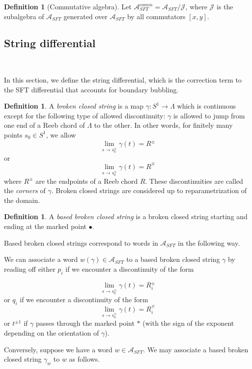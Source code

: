 \documentclass[a4paper,final, reqno]{amsart}
\theoremstyle{plain}
\theoremstyle{definition}
\newtheorem{Def}[Th]{Definition}
\newcommand{\A}{\mathcal{A}}
\begin{document}
	
	\begin{Def}[Commutative algebra]
		Let $\A_{SFT}^{comm} = \A_{SFT}/\mathcal{J}$, where $\mathcal{J}$ is the subalgebra of $\A_{SFT}$ generated over $\A_{SFT}$ by all commutators $[x,y]$.
	\end{Def}
	
	
	
	\subsection{String differential}
	
	\-\
	
	In this section, we define the string differential, which is the correction term to the SFT differential that accounts for boundary bubbling.
	
	
	
	\begin{Def}
		A \emph{broken closed string} is a map $\gamma: S^1 \to \Lambda$ which is continuous except for the following type of allowed discontinuity: $\gamma$ is allowed to jump from one end of a Reeb chord of $\Lambda$ to the other. In other words, for finitely many points $s_0 \in S^1$, we allow 
		\[ \lim_{s\to s_0^{\pm}}  \gamma(t) = R^\pm \]
		or 
		\[ \lim_{s\to s_0^{\pm}}  \gamma(t) = R^\mp \]
		where $R^\pm$ are the endpoints of a Reeb chord $R$. These discontinuities are called the \emph{corners} of $\gamma$. 
		Broken closed strings are considered up to reparametrization of the domain.	
	\end{Def}
	
	\begin{Def}
		A \emph{based broken closed string} is a broken closed string starting and ending at the marked point $\bullet$. 
	\end{Def}
	
	Based broken closed strings correspond to words in $\A_{SFT}$ in the following way.
	
	We can associate a word $w(\gamma) \in \A_{SFT}$ to a based broken closed string $\gamma$ by reading off either $p_i$ if we encounter a discontinuity of the form 
	
	\[ \lim_{s\to s_0^{\pm}}  \gamma(t) = R_i^\pm \]
	or $q_i$ if we encounter a discontinuity of the form 
	\[ \lim_{s\to s_0^{\pm}}  \gamma(t) = R_i^\mp \]
	or $t^{\pm 1}$ if $\gamma$ passes through the marked point $*$ (with the sign of the exponent depending on the orientation of $\gamma$).
	
	
	Conversely, suppose we have a word $w \in \A_{SFT}$. We may associate a based broken closed string $\gamma_w$ to $w$ as follows. 
	
\end{document}
